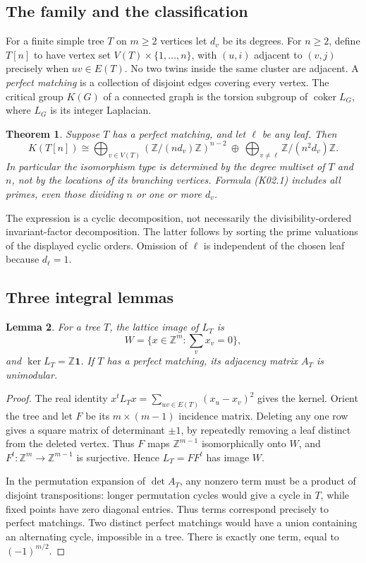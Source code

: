 \documentclass[11pt,a4paper]{article}
\newtheorem{theorem}{Theorem}[section]
\newtheorem{lemma}[theorem]{Lemma}
\theoremstyle{definition}\newtheorem{definition}[theorem]{Definition}
\theoremstyle{remark}\newtheorem{remark}[theorem]{Remark}
\newcommand{\Z}{\mathbb Z}\newcommand{\Q}{\mathbb Q}\newcommand{\F}{\mathbb F}
\DeclareMathOperator{\coker}{coker}\DeclareMathOperator{\diag}{diag}\DeclareMathOperator{\rank}{rank}
\numberwithin{equation}{section}
\begin{document}
\subsection{The family and the classification}\label{K02-sec-1}
For a finite simple tree $T$ on $m\geq2$ vertices let $d_v$ be its degrees. For $n\geq2$, define $T[n]$ to have vertex set $V(T)\times\{1,\ldots,n\}$, with $(u,i)$ adjacent to $(v,j)$ precisely when $uv\in E(T)$. No two twins inside the same cluster are adjacent. A \emph{perfect matching} is a collection of disjoint edges covering every vertex. The critical group $K(G)$ of a connected graph is the torsion subgroup of $\coker L_G$, where $L_G$ is its integer Laplacian.

\begin{theorem}\label{K02-classification}
Suppose $T$ has a perfect matching, and let $\ell$ be any leaf. Then
\[
 K(T[n])\cong
 \bigoplus_{v\in V(T)}\left(\Z/(nd_v)\Z\right)^{n-2}
 \ \oplus\ \bigoplus_{v\ne\ell}\Z/(n^2d_v)\Z.                 \tag{K02.1}
\]
In particular the isomorphism type is determined by the degree multiset of $T$ and $n$, not by the locations of its branching vertices. Formula (K02.1) includes all primes, even those dividing $n$ or one or more $d_v$.
\end{theorem}
The expression is a cyclic decomposition, not necessarily the divisibility-ordered invariant-factor decomposition. The latter follows by sorting the prime valuations of the displayed cyclic orders. Omission of $\ell$ is independent of the chosen leaf because $d_\ell=1$.

\subsection{Three integral lemmas}\label{K02-sec-2}
\begin{lemma}\label{K02-tree}
For a tree $T$, the lattice image of $L_T$ is
\[
 W=\{x\in\Z^m:\textstyle\sum_vx_v=0\},
\]
and $\ker L_T=\Z\mathbf1$. If $T$ has a perfect matching, its adjacency matrix $A_T$ is unimodular.
\end{lemma}
\begin{proof}
The real identity $x^tL_Tx=\sum_{uv\in E(T)}(x_u-x_v)^2$ gives the kernel. Orient the tree and let $F$ be its $m\times(m-1)$ incidence matrix. Deleting any one row gives a square matrix of determinant $\pm1$, by repeatedly removing a leaf distinct from the deleted vertex. Thus $F$ maps $\Z^{m-1}$ isomorphically onto $W$, and $F^t:\Z^m\to\Z^{m-1}$ is surjective. Hence $L_T=FF^t$ has image $W$.

In the permutation expansion of $\det A_T$, any nonzero term must be a product of disjoint transpositions: longer permutation cycles would give a cycle in $T$, while fixed points have zero diagonal entries. Thus terms correspond precisely to perfect matchings. Two distinct perfect matchings would have a union containing an alternating cycle, impossible in a tree. There is exactly one term, equal to $(-1)^{m/2}$.
\end{proof}
\end{document}
